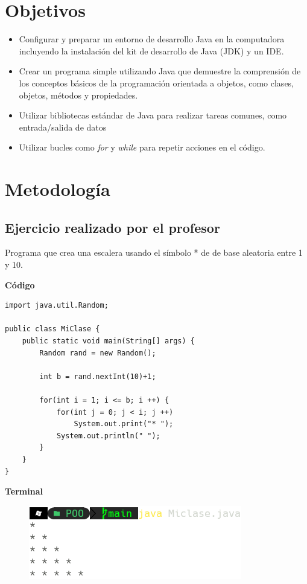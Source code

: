\documentclass[11pt, twocolumn]{article}
\begin{document}
    \section*{Objetivos}
    \begin{itemize}
        \item Configurar y preparar un entorno de desarrollo Java en la computadora incluyendo la instalación del kit de desarrollo de Java (JDK) y un IDE.
        \item Crear un programa simple utilizando Java que demuestre la comprensión de los conceptos básicos de la programación orientada a objetos, como clases, objetos, métodos y propiedades.
        \item Utilizar bibliotecas estándar de Java para realizar tareas comunes, como entrada/salida de datos 
        \item Utilizar bucles como \textit{for} y \textit{while} para repetir acciones en el código.
    \end{itemize}

    \section*{Metodología} 
    \subsection*{Ejercicio realizado por el profesor}
    Programa que crea una escalera usando el símbolo * de de base aleatoria entre 1 y 10. 
    
    \textbf{Código}
    \begin{lstlisting}
import java.util.Random;

public class MiClase {
    public static void main(String[] args) {
        Random rand = new Random();

        int b = rand.nextInt(10)+1;

        for(int i = 1; i <= b; i ++) {
            for(int j = 0; j < i; j ++)
                System.out.print("* ");
            System.out.println(" ");
        }
    }
}
    \end{lstlisting}

    \textbf{Terminal}
    \begin{figure}[ht]
        \includegraphics[width=0.75\columnwidth, center]{Pa.png}
    \end{figure}
\end{document}
